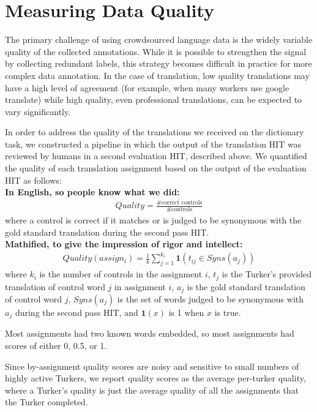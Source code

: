 \documentclass[11pt]{article}
\begin{document}
\section{Measuring Data Quality}
The primary challenge of using crowdsourced language data is the widely variable quality of the collected annotations. While it is possible to strengthen the signal by collecting redundant labels, this strategy becomes difficult in practice for more complex data annotation. In the case of translation, low quality translations may have a high level of agreement (for example, when many workers use google translate) while high quality, even professional translations, can be expected to vary significantly.
 
In order to address the quality of the translations we received on the dictionary task, we constructed a pipeline in which the output of the translation HIT was reviewed by humans in a second evaluation HIT, described above.  We quantified the quality of each translation assignment based on the output of the evaluation HIT as follows: \\
\textbf{In English, so people know what we did:}
\begin{align}	
	Quality = \frac{\# \text{correct controls}}{\# \text{controls}}
\end{align}	
where a control is correct if it matches or is judged to be synonymous with the gold standard translation during the second pass HIT. \\
\textbf{Mathified, to give the impression of rigor and intellect:}
\begin{align}	
	Quality(assign_i) = \frac{1}{k}\sum\limits_{j=1}^{k_i}\mathbf{1}(t_{ij} \in Syns(a_j))
\end{align}	
where $k_i$ is the number of controls in the assignment $i$, $t_j$ is the Turker's provided translation of control word $j$ in assignment $i$, $a_j$ is the gold standard translation of control word $j$, $Syns(a_j)$ is the set of words judged to be synonymous with $a_j$ during the second pass HIT, and $\mathbf{1}(x)$ is 1 when $x$ is true. 

Most assignments had two known words embedded, so most assignments had scores of either 0, 0.5, or 1. 

Since by-assignment quality scores are noisy and sensitive to small numbers of highly active Turkers, we report quality scores as the average per-turker quality, where a Turker's quality is just the average quality of all the assignments that the Turker completed.
\end{document}
